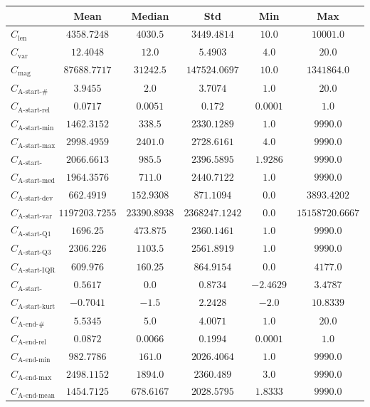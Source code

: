 \documentclass{standalone}
\newcommand{\magnitudename}{\text{mag}}
\newcommand{\magnitude}{C_{\magnitudename}}
\newcommand{\varietyname}{\text{var}}
\newcommand{\variety}{C_{\varietyname}}
\newcommand{\lengthname}{\text{len}}
\newcommand{\length}{C_{\lengthname}}
\newcommand{\startactivitiesname}{\text{A-start-\#}}
\newcommand{\startactivities}{C_{\startactivitiesname}}
\newcommand{\startactivitiesrelname}{\text{A-start-rel}}
\newcommand{\startactivitiesrel}{C_{\startactivitiesrelname}}
\newcommand{\startminname}{\text{A-start-min}}
\newcommand{\startmin}{C_{\startminname}}
\newcommand{\startmaxname}{\text{A-start-max}}
\newcommand{\startmax}{C_{\startmaxname}}
\newcommand{\startmeanname}{\text{A-start-mean}}
\newcommand{\startmean}{C_{\startmeanname}}
\newcommand{\startmedianname}{\text{A-start-med}}
\newcommand{\startmedian}{C_{\startmedianname}}
\newcommand{\startdevname}{\text{A-start-dev}}
\newcommand{\startdev}{C_{\startdevname}}
\newcommand{\startvarname}{\text{A-start-var}}
\newcommand{\startvar}{C_{\startvarname}}
\newcommand{\startqonename}{\text{A-start-Q1}}
\newcommand{\startqone}{C_{\startqonename}}
\newcommand{\startqthreename}{\text{A-start-Q3}}
\newcommand{\startqthree}{C_{\startqthreename}}
\newcommand{\startiqrname}{\text{A-start-IQR}}
\newcommand{\startiqr}{C_{\startiqrname}}
\newcommand{\startskewname}{\text{A-start-skew}}
\newcommand{\startskew}{C_{\startskewname}}
\newcommand{\startkurtname}{\text{A-start-kurt}}
\newcommand{\startkurt}{C_{\startkurtname}}
\newcommand{\lastactivitiesname}{\text{A-end-\#}}
\newcommand{\lastactivities}{C_{\lastactivitiesname}}
\newcommand{\lastactivitiesrelname}{\text{A-end-rel}}
\newcommand{\lastactivitiesrel}{C_{\lastactivitiesrelname}}
\newcommand{\lastminname}{\text{A-end-min}}
\newcommand{\lastmin}{C_{\lastminname}}
\newcommand{\lastmaxname}{\text{A-end-max}}
\newcommand{\lastmax}{C_{\lastmaxname}}
\newcommand{\lastmeanname}{\text{A-end-mean}}
\newcommand{\lastmean}{C_{\lastmeanname}}
\begin{document}
\begin{tabular}{lccccc} \toprule 
 & \textbf{Mean} & \textbf{Median} & \textbf{Std} & \textbf{Min} & \textbf{Max} \\ \midrule 
$\length$ & $4358.7248$ & $4030.5$ & $3449.4814$ & $10.0$ & $10001.0$ \\ 
$\variety$ & $12.4048$ & $12.0$ & $5.4903$ & $4.0$ & $20.0$ \\ 
$\magnitude$ & $87688.7717$ & $31242.5$ & $147524.0697$ & $10.0$ & $1341864.0$ \\ 
$\startactivities$ & $3.9455$ & $2.0$ & $3.7074$ & $1.0$ & $20.0$ \\ 
$\startactivitiesrel$ & $0.0717$ & $0.0051$ & $0.172$ & $0.0001$ & $1.0$ \\ 
$\startmin$ & $1462.3152$ & $338.5$ & $2330.1289$ & $1.0$ & $9990.0$ \\ 
$\startmax$ & $2998.4959$ & $2401.0$ & $2728.6161$ & $4.0$ & $9990.0$ \\ 
$\startmean$ & $2066.6613$ & $985.5$ & $2396.5895$ & $1.9286$ & $9990.0$ \\ 
$\startmedian$ & $1964.3576$ & $711.0$ & $2440.7122$ & $1.0$ & $9990.0$ \\ 
$\startdev$ & $662.4919$ & $152.9308$ & $871.1094$ & $0.0$ & $3893.4202$ \\ 
$\startvar$ & $1197203.7255$ & $23390.8938$ & $2368247.1242$ & $0.0$ & $15158720.6667$ \\ 
$\startqone$ & $1696.25$ & $473.875$ & $2360.1461$ & $1.0$ & $9990.0$ \\ 
$\startqthree$ & $2306.226$ & $1103.5$ & $2561.8919$ & $1.0$ & $9990.0$ \\ 
$\startiqr$ & $609.976$ & $160.25$ & $864.9154$ & $0.0$ & $4177.0$ \\ 
$\startskew$ & $0.5617$ & $0.0$ & $0.8734$ & $-2.4629$ & $3.4787$ \\ 
$\startkurt$ & $-0.7041$ & $-1.5$ & $2.2428$ & $-2.0$ & $10.8339$ \\ 
$\lastactivities$ & $5.5345$ & $5.0$ & $4.0071$ & $1.0$ & $20.0$ \\ 
$\lastactivitiesrel$ & $0.0872$ & $0.0066$ & $0.1994$ & $0.0001$ & $1.0$ \\ 
$\lastmin$ & $982.7786$ & $161.0$ & $2026.4064$ & $1.0$ & $9990.0$ \\ 
$\lastmax$ & $2498.1152$ & $1894.0$ & $2360.489$ & $3.0$ & $9990.0$ \\ 
$\lastmean$ & $1454.7125$ & $678.6167$ & $2028.5795$ & $1.8333$ & $9990.0$ \\ 

\end{tabular}
\end{document}
